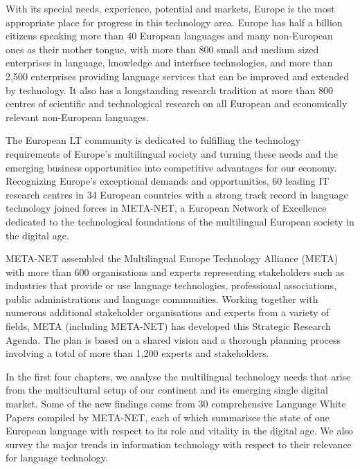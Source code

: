 \documentclass[10pt, plain]{../../metanetpaper}
\begin{document}
\begin{multicols}{2}
With its special needs, experience, potential and markets, Europe is the most appropriate place for progress in this technology area. Europe has half a billion citizens speaking more than 40 European languages and many non-European ones as their mother tongue, with more than 800 small and medium sized enterprises in language, knowledge and interface technologies, and more than 2,500 enterprises providing language services that can be improved and extended by technology. It also has a longstanding research tradition at more than 800 centres of scientific and technological research on all European and economically relevant non-European languages. 

The European LT community is dedicated to fulﬁlling the technology requirements of Europe’s multilingual society and turning these needs and the emerging business opportunities into competitive advantages for our economy. Recognizing Europe’s exceptional demands and opportunities, 60 leading IT research centres in 34 European countries with a strong track record in language technology joined forces in META-NET, a European Network of Excellence dedicated to the technological foundations of the multilingual European society in the digital age. 

META-NET assembled the Multilingual Europe Technology Alliance (META) with more than 600 organisations and experts representing stakeholders such as industries that provide or use language technologies, professional associations, public administrations and language communities. Working together with numerous additional stakeholder organisations and experts from a variety of fields, META (including META-NET) has developed this Strategic Research Agenda. The plan is based on a shared vision and a thorough planning process involving a total of more than 1,200 experts and stakeholders. 

In the ﬁrst four chapters, we analyse the multilingual technology needs that arise from the multicultural setup of our continent and its emerging single digital market. Some of the new findings come from 30 comprehensive Language White Papers compiled by META-NET, each of which summarises the state of one European language with respect to its role and vitality in the digital age. We also survey the major trends in information technology with respect to their relevance for language technology. 


\end{multicols}
\end{document}
